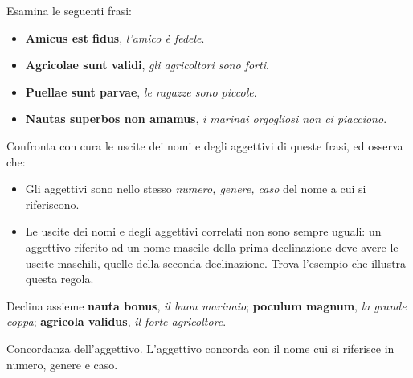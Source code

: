 \documentclass[nols]{tufte-handout}
\newcommand{\textls}[2][5]{%
    \begingroup\addfontfeatures{LetterSpace=#1}#2\endgroup
  }
\renewcommand{\smallcapsspacing}[1]{\textls[10]{#1}}
\renewcommand{\textsc}[1]{\smallcapsspacing{\textsmallcaps{#1}}}
\begin{document}
 Esamina le seguenti frasi:
\begin{itemize}
\item[\textsc{1.}] \textbf{Amicus est fidus}, \textit{l'amico è fedele}.  
\item[\textsc{2.}] \textbf{Agricolae sunt validi}, \textit{gli agricoltori sono forti}.  
\item[\textsc{3.}] \textbf{Puellae sunt parvae}, \textit{le ragazze sono piccole}.  
\item[\textsc{4.}] \textbf{Nautas superbos non amamus}, \textit{i marinai orgogliosi non ci piacciono}.  
\end{itemize}
Confronta con cura le uscite dei nomi e degli aggettivi di queste frasi, ed osserva che: \\
\begin{itemize}
\item[\textsc{a.}] Gli aggettivi sono nello stesso \textit{numero, genere, caso} del nome a cui si riferiscono.
\item[\textsc{b.}] Le uscite dei nomi e degli aggettivi correlati non sono sempre uguali: un aggettivo riferito ad un nome mascile della prima declinazione deve avere le uscite maschili, quelle della seconda declinazione. Trova l'esempio che illustra questa regola.
\end{itemize}

 Declina assieme \textbf{nauta bonus}, \textit{il buon marinaio};  
\textbf{poculum magnum}, \textit{la grande coppa};
\textbf{agricola validus}, \textit{il forte agricoltore}.

 Concordanza dell'aggettivo. L'aggettivo concorda con il nome cui si riferisce in numero, genere e caso.

\end{document}
